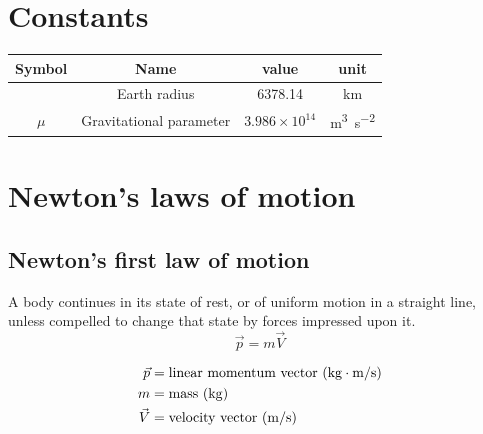 \documentclass{article}
\begin{document}
\section{Constants}
\begin{center}
	\begin{tabular}{|c | c |  c | c |} 
		\hline
		Symbol & Name & value & unit \\ [0.5ex] 
		\hline\hline
		& Earth radius & 6378.14 & km \\ 
		\hline
		$\mu$ & Gravitational parameter & $3.986 \times 10^{14}$ & \si{\meter\cubed\per\second\squared} \\ 
		\hline
	\end{tabular}
\end{center}

\section{Newton's laws of motion}
\subsection{Newton's first law of motion}
\begin{multicols}{2}
A body continues in its state of rest, or of uniform motion in a straight line, unless compelled to change that state by forces impressed upon it.
\vfill\null
\columnbreak
\begin{equation*}
	\boxed{\vec{p} = m\vec{V}}
\end{equation*}

\begin{align*}
\vec{p} &= \text{linear momentum vector (\si{\kilo\gram\meter\per\second})}\\
m &= \text{mass (\si{\kilo\gram})}\\
\vec{V} &= \text{velocity vector (\si{\meter\per\second})}\\
\end{align*}

\end{multicols}
\end{document}

